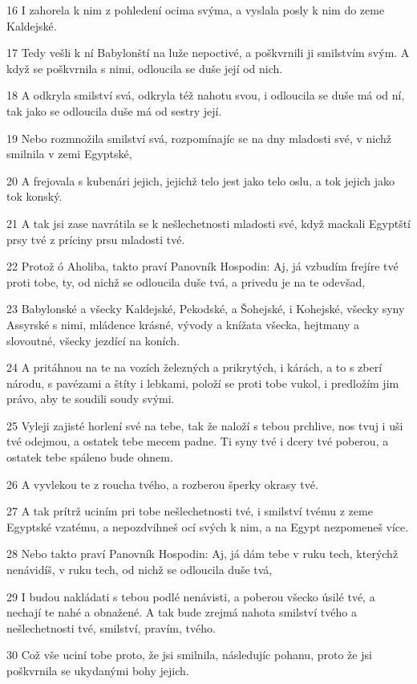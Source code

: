 \par 16 I zahorela k nim z pohledení ocima svýma, a vyslala posly k nim do zeme Kaldejské.
\par 17 Tedy vešli k ní Babylonští na luže nepoctivé, a poškvrnili ji smilstvím svým. A když se poškvrnila s nimi, odloucila se duše její od nich.
\par 18 A odkryla smilství svá, odkryla též nahotu svou, i odloucila se duše má od ní, tak jako se odloucila duše má od sestry její.
\par 19 Nebo rozmnožila smilství svá, rozpomínajíc se na dny mladosti své, v nichž smilnila v zemi Egyptské,
\par 20 A frejovala s kubenári jejich, jejichž telo jest jako telo oslu, a tok jejich jako tok konský.
\par 21 A tak jsi zase navrátila se k nešlechetnosti mladosti své, když mackali Egyptští prsy tvé z príciny prsu mladosti tvé.
\par 22 Protož ó Aholiba, takto praví Panovník Hospodin: Aj, já vzbudím frejíre tvé proti tobe, ty, od nichž se odloucila duše tvá, a privedu je na te odevšad,
\par 23 Babylonské a všecky Kaldejské, Pekodské, a Šohejské, i Kohejské, všecky syny Assyrské s nimi, mládence krásné, vývody a knížata všecka, hejtmany a slovoutné, všecky jezdící na koních.
\par 24 A pritáhnou na te na vozích železných a prikrytých, i kárách, a to s zberí národu, s pavézami a štíty i lebkami, položí se proti tobe vukol, i predložím jim právo, aby te soudili soudy svými.
\par 25 Vyleji zajisté horlení své na tebe, tak že naloží s tebou prchlive, nos tvuj i uši tvé odejmou, a ostatek tebe mecem padne. Ti syny tvé i dcery tvé poberou, a ostatek tebe spáleno bude ohnem.
\par 26 A vyvlekou te z roucha tvého, a rozberou šperky okrasy tvé.
\par 27 A tak prítrž uciním pri tobe nešlechetnosti tvé, i smilství tvému z zeme Egyptské vzatému, a nepozdvihneš ocí svých k nim, a na Egypt nezpomeneš více.
\par 28 Nebo takto praví Panovník Hospodin: Aj, já dám tebe v ruku tech, kterýchž nenávidíš, v ruku tech, od nichž se odloucila duše tvá,
\par 29 I budou nakládati s tebou podlé nenávisti, a poberou všecko úsilé tvé, a nechají te nahé a obnažené. A tak bude zrejmá nahota smilství tvého a nešlechetnosti tvé, smilství, pravím, tvého.
\par 30 Což vše uciní tobe proto, že jsi smilnila, následujíc pohanu, proto že jsi poškvrnila se ukydanými bohy jejich.
